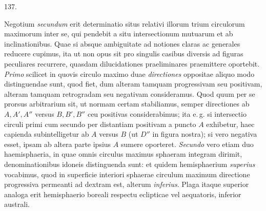 \par{}\medskip
\begin{center}\hypertarget{native-183-article137}{}137.\end{center}
Negotium \emph{secundum} erit determinatio situs relativi illorum trium circulorum
maximorum inter se, qui pendebit a situ intersectionum mutuarum et ab
inclinationibus. Quae si absque ambiguitate ad notiones claras ac generales
reducere cupimus, ita ut non opus sit pro singulis casibus diversis ad figuras
peculiares recurrere, quasdam dilucidationes praeliminares praemittere oportebit.
\emph{Primo} scilicet in quovis circulo maximo duae \emph{directiones} oppositae aliquo modo
distinguendae sunt, quod fiet, dum alteram tamquam progressivam seu positivam,
alteram tamquam retrogradam seu negativam consideramus. Quod quum
per se prorsus arbitrarium sit, ut normam certam stabiliamus, semper directiones
ab $A,A',A''$ versus $B,B',B''$ ceu positivas considerabimus; ita e.\,g. si
intersectio circuli primi cum secundo per distantiam positivam a puncto $A$
exhibetur, haec capienda subintelligetur ab $A$ versus $B$ (ut $D''$ in figura nostra);
si vero negativa esset, ipsam ab altera parte ipsius $A$ sumere oporteret. \emph{Secundo}
vero etiam duo haemisphaeria, in quae omnis circulus maximus sphaeram
integram dirimit, denominationibus idoneis distinguenda sunt: et quidem
hemisphaerium \emph{superius} vocabimus, quod in superficie interiori sphaerae circulum
maximum directione progressiva permeanti ad dextram est, alterum \emph{inferius}.
Plaga itaque superior analoga erit hemisphaerio boreali respectu eclipticae
vel aequatoris, inferior australi.

